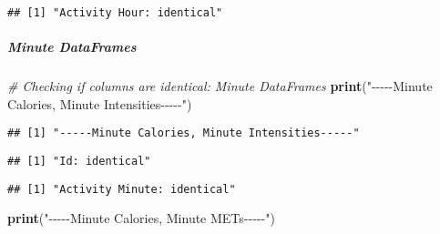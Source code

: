 \documentclass[
]{article}
\newenvironment{Shaded}{\begin{snugshade}}{\end{snugshade}}
\newcommand{\CommentTok}[1]{\textcolor[rgb]{0.56,0.35,0.01}{\textit{#1}}}
\newcommand{\ControlFlowTok}[1]{\textcolor[rgb]{0.13,0.29,0.53}{\textbf{#1}}}
\newcommand{\DecValTok}[1]{\textcolor[rgb]{0.00,0.00,0.81}{#1}}
\newcommand{\FunctionTok}[1]{\textcolor[rgb]{0.13,0.29,0.53}{\textbf{#1}}}
\newcommand{\NormalTok}[1]{#1}
\newcommand{\SpecialCharTok}[1]{\textcolor[rgb]{0.81,0.36,0.00}{\textbf{#1}}}
\newcommand{\StringTok}[1]{\textcolor[rgb]{0.31,0.60,0.02}{#1}}
\begin{document}
\begin{verbatim}
## [1] "Activity Hour: identical"
\end{verbatim}

\hypertarget{minute-dataframes-6}{%
\subparagraph{Minute DataFrames}\label{minute-dataframes-6}}

\begin{Shaded}
\begin{Highlighting}[]
\CommentTok{\# Checking if columns are identical: Minute DataFrames}
\FunctionTok{print}\NormalTok{(}\StringTok{"{-}{-}{-}{-}{-}Minute Calories, Minute Intensities{-}{-}{-}{-}{-}"}\NormalTok{)}
\end{Highlighting}
\end{Shaded}

\begin{verbatim}
## [1] "-----Minute Calories, Minute Intensities-----"
\end{verbatim}

\begin{Shaded}
\end{Shaded}

\begin{verbatim}
## [1] "Id: identical"
\end{verbatim}

\begin{Shaded}
\end{Shaded}

\begin{verbatim}
## [1] "Activity Minute: identical"
\end{verbatim}

\begin{Shaded}
\begin{Highlighting}[]
\FunctionTok{print}\NormalTok{(}\StringTok{"{-}{-}{-}{-}{-}Minute Calories, Minute METs{-}{-}{-}{-}{-}"}\NormalTok{)}
\end{Highlighting}
\end{Shaded}
\end{document}
